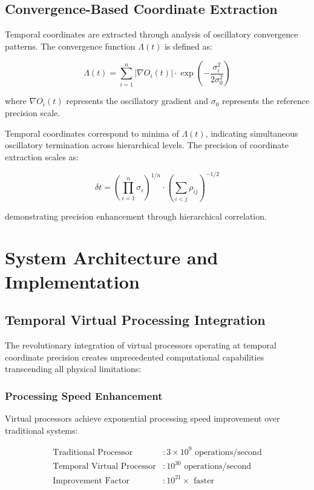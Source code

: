 \documentclass[11pt]{article}
\theoremstyle{remark}
\begin{document}
\subsection{Convergence-Based Coordinate Extraction}

Temporal coordinates are extracted through analysis of oscillatory convergence patterns. The convergence function $\Lambda(t)$ is defined as:

$$\Lambda(t) = \sum_{i=1}^{n} |\nabla O_i(t)| \cdot \exp\left(-\frac{\sigma_i^2}{2\sigma_0^2}\right)$$

where $\nabla O_i(t)$ represents the oscillatory gradient and $\sigma_0$ represents the reference precision scale.

Temporal coordinates correspond to minima of $\Lambda(t)$, indicating simultaneous oscillatory termination across hierarchical levels. The precision of coordinate extraction scales as:

$$\delta t = \left(\prod_{i=1}^{n} \sigma_i\right)^{1/n} \cdot \left(\sum_{i<j} \rho_{ij}\right)^{-1/2}$$

demonstrating precision enhancement through hierarchical correlation.

\section{System Architecture and Implementation}

\subsection{Temporal Virtual Processing Integration}

The revolutionary integration of virtual processors operating at temporal coordinate precision creates unprecedented computational capabilities transcending all physical limitations:

\subsubsection{Processing Speed Enhancement}

Virtual processors achieve exponential processing speed improvement over traditional systems:

\begin{align}
\text{Traditional Processor} &: 3 \times 10^9 \text{ operations/second} \\
\text{Temporal Virtual Processor} &: 10^{30} \text{ operations/second} \\
\text{Improvement Factor} &: 10^{21}\times \text{ faster}
\end{align}
\end{document}
